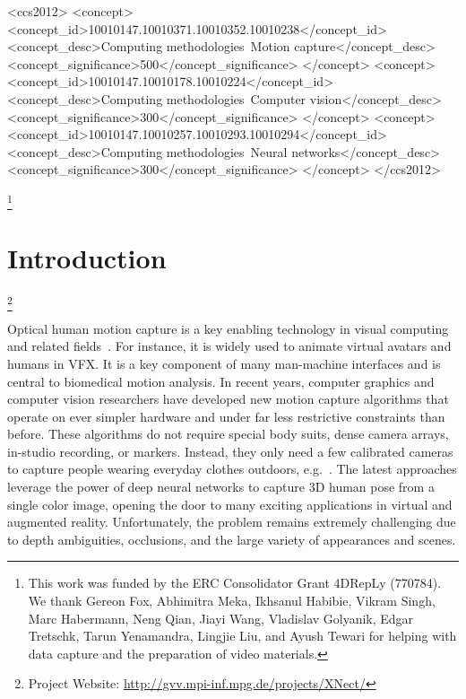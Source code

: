 \documentclass[acmtog,authorversion]{acmart}
\newcommand{\eg}{e.g.~}
\newcommand\blfootnote[1]{\begingroup
  \renewcommand\thefootnote{}\footnote{#1}\addtocounter{footnote}{-1}\endgroup
}
\begin{document}
\begin{CCSXML}
<ccs2012>
<concept>
<concept_id>10010147.10010371.10010352.10010238</concept_id>
<concept_desc>Computing methodologies~Motion capture</concept_desc>
<concept_significance>500</concept_significance>
</concept>
<concept>
<concept_id>10010147.10010178.10010224</concept_id>
<concept_desc>Computing methodologies~Computer vision</concept_desc>
<concept_significance>300</concept_significance>
</concept>
<concept>
<concept_id>10010147.10010257.10010293.10010294</concept_id>
<concept_desc>Computing methodologies~Neural networks</concept_desc>
<concept_significance>300</concept_significance>
</concept>
</ccs2012>
\end{CCSXML}




\thanks{This work was funded by the ERC Consolidator Grant 4DRepLy (770784). We thank Gereon Fox, Abhimitra Meka, Ikhsanul Habibie, Vikram Singh, Marc Habermann, Neng Qian, Jiayi Wang, Vladislav Golyanik, Edgar Tretschk, Tarun Yenamandra, Lingjie Liu, and Ayush Tewari for helping with data capture and the preparation of video materials.}

\maketitle
\section{Introduction}
\label{sec:intro}

\blfootnote{Project Website: \url{http://gvv.mpi-inf.mpg.de/projects/XNect/}}

Optical human motion capture is a key enabling technology in visual computing and related fields~\cite{chai2005performance,starck2007surface,Menache:2010:UMC:1965363}. 
For instance, it is widely used to animate virtual avatars and humans in VFX. It is a key component of many man-machine interfaces and is central to biomedical motion analysis. 
In recent years, computer graphics and computer vision researchers have developed new motion capture algorithms that operate on ever simpler hardware and under far less restrictive constraints than before.   
These algorithms do not require special body suits, dense camera arrays, in-studio recording, or markers. Instead, they only need a few calibrated cameras to capture people wearing everyday clothes outdoors, \eg\citet{stoll_fast_iccv2011,RhodinRCRST16,elhayek_convmocap_TPAMI2016,omran2018neural,kanazawa2018endtoend,pavlakos2019expressive,xiang2018monocular,VNect_SIGGRAPH2017,huang2017towards,fang2018learning}.
The latest approaches leverage the power of deep neural networks to capture 3D human pose from a single color image, opening the door to many exciting applications in virtual and augmented reality. Unfortunately, the problem remains extremely challenging due to depth ambiguities, occlusions, and the large variety of appearances and scenes. 
\end{document}
